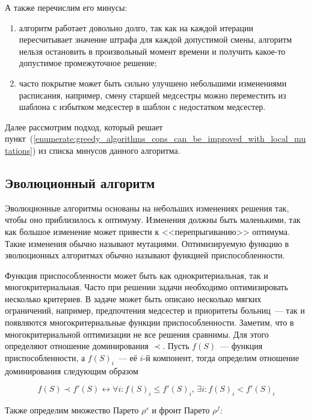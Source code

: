 \documentclass[times,specification,annotation]{itmo-student-thesis}
\begin{document}
А также перечислим его минусы:

\begin{enumerate}
    \item алгоритм работает довольно долго, так как на каждой итерации пересчитывает значение штрафа для каждой допустимой смены, алгоритм нельзя остановить в произвольный момент времени и получить какое-то допустимое промежуточное решение;
    \item \label{enumerate:greedy_algorithms_cons_can_be_improved_with_local_mutations} часто покрытие может быть сильно улучшено небольшими изменениями расписания, например, смену старшей медсестры можно переместить из шаблона с избытком медсестер в шаблон с недостатком медсестер.
\end{enumerate}

Далее рассмотрим подход, который решает пункт~(\ref{enumerate:greedy_algorithms_cons_can_be_improved_with_local_mutations}) из списка минусов данного алгоритма.

\subsection{Эволюционный алгоритм}

Эволюционные алгоритмы основаны на небольших изменениях решения так, чтобы оно приблизилось к оптимуму.
Изменения должны быть маленькими, так как большое изменение может привести к <<перепрыгиванию>> оптимума.
Такие изменения обычно называют мутациями.
Оптимизируемую функцию в эволюционных алгоритмах обычно называют функцией приспособленности.

Функция приспособленности может быть как однокритериальная, так и многокритериальная.
Часто при решении задачи необходимо оптимизировать несколько критериев.
В задаче может быть описано несколько мягких ограничений, например, предпочтения медсестер и приоритеты больниц~--- так и появляются многокритериальные функции приспособленности.
Заметим, что в многокритериальной оптимизации не все решения сравнимы.
Для этого определяют отношение доминирования $\prec$.
Пусть $f(S)$~--- функция приспособленности, а $f(S)_i$~--- её $i$-й компонент, тогда определим отношение доминирования следующим образом

\begin{equation} f(S) \prec f'(S) \leftrightarrow \forall i : f(S)_i \le f'(S)_i,\, \exists i : f(S)_i < f'(S)_i \end{equation}

Также определим множество Парето $\rho^s$ и фронт Парето $\rho^f$:
\end{document}

